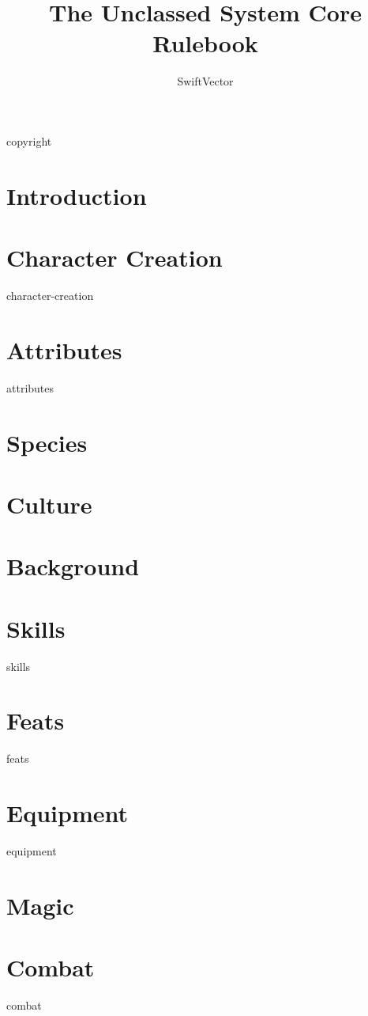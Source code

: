 \documentclass[9pt]{extbook}
\title{The Unclassed System Core Rulebook}
\author{SwiftVector}
\begin{document}
\maketitle

\frontmatter

{copyright}

\tableofcontents

\mainmatter
\chapter{Introduction}


\chapter{Character Creation}
{character-creation}

\chapter{Attributes}\label{attributes}
{attributes}

\chapter{Species}\label{species}


\chapter{Culture}\label{culture}


\chapter{Background}\label{background}


\chapter{Skills}\label{skills}
{skills}

\chapter{Feats}\label{feats}
{feats}

\chapter{Equipment}\label{equipment}
{equipment}

\chapter{Magic}\label{magic}


\chapter{Combat}\label{combat}
{combat}

\backmatter

\printindex

\glsaddallunused
\printglossary[type=\acronymtype]
\printglossary
\end{document}
